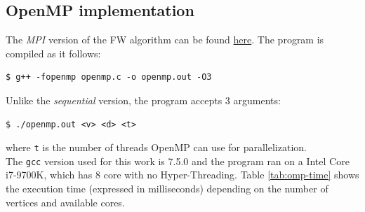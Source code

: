 \subsection{OpenMP implementation}
The \emph{MPI} version of the FW algorithm can be found \href{https://github.com/firaja/Parallel-FloydWarshall/blob/master/openmp.c}{here}. 
The program is compiled as it follows:
\begin{lstlisting}[basicstyle=\footnotesize\ttfamily]
$ g++ -fopenmp openmp.c -o openmp.out -O3
\end{lstlisting}
Unlike the \emph{sequential} version, the program accepts 3 arguments:
\begin{lstlisting}[basicstyle=\footnotesize\ttfamily]
$ ./openmp.out <v> <d> <t>
\end{lstlisting}
where \texttt{t} is the number of threads OpenMP can use for parallelization. \\
The \texttt{gcc} version used for this work is 7.5.0 and the program ran on a Intel Core i7-9700K, which has 8 core with no Hyper-Threading.
Table \ref*{tab:omp-time} shows the execution time (expressed in milliseconds) depending on the number of vertices and available cores.

